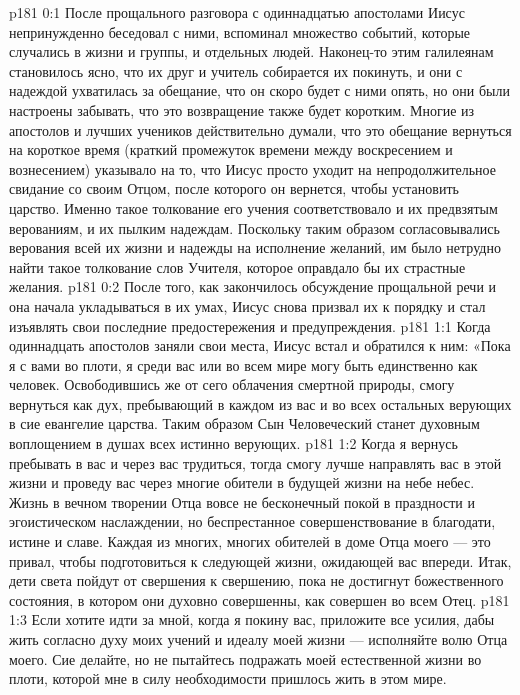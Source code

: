 \author{Комиссия срединников}
\vs p181 0:1 После прощального разговора с одиннадцатью апостолами Иисус непринужденно беседовал с ними, вспоминал множество событий, которые случались в жизни и группы, и отдельных людей. Наконец\hyp{}то этим галилеянам становилось ясно, что их друг и учитель собирается их покинуть, и они с надеждой ухватилась за обещание, что он скоро будет с ними опять, но они были настроены забывать, что это возвращение также будет коротким. Многие из апостолов и лучших учеников действительно думали, что это обещание вернуться на короткое время (краткий промежуток времени между воскресением и вознесением) указывало на то, что Иисус просто уходит на непродолжительное свидание со своим Отцом, после которого он вернется, чтобы установить царство. Именно такое толкование его учения соответствовало и их предвзятым верованиям, и их пылким надеждам. Поскольку таким образом согласовывались верования всей их жизни и надежды на исполнение желаний, им было нетрудно найти такое толкование слов Учителя, которое оправдало бы их страстные желания.
\vs p181 0:2 После того, как закончилось обсуждение прощальной речи и она начала укладываться в их умах, Иисус снова призвал их к порядку и стал изъявлять свои последние предостережения и предупреждения.
\vs p181 1:1 Когда одиннадцать апостолов заняли свои места, Иисус встал и обратился к ним: «Пока я с вами во плоти, я среди вас или во всем мире могу быть единственно как человек. Освободившись же от сего облачения смертной природы, смогу вернуться как дух, пребывающий в каждом из вас и во всех остальных верующих в сие евангелие царства. Таким образом Сын Человеческий станет духовным воплощением в душах всех истинно верующих.
\vs p181 1:2 Когда я вернусь пребывать в вас и через вас трудиться, тогда смогу лучше направлять вас в этой жизни и проведу вас через многие обители в будущей жизни на небе небес. Жизнь в вечном творении Отца вовсе не бесконечный покой в праздности и эгоистическом наслаждении, но беспрестанное совершенствование в благодати, истине и славе. Каждая из многих, многих обителей в доме Отца моего --- это привал, чтобы подготовиться к следующей жизни, ожидающей вас впереди. Итак, дети света пойдут от свершения к свершению, пока не достигнут божественного состояния, в котором они духовно совершенны, как совершен во всем Отец.
\vs p181 1:3 Если хотите идти за мной, когда я покину вас, приложите все усилия, дабы жить согласно духу моих учений и идеалу моей жизни --- исполняйте волю Отца моего. Сие делайте, но не пытайтесь подражать моей естественной жизни во плоти, которой мне в силу необходимости пришлось жить в этом мире.
